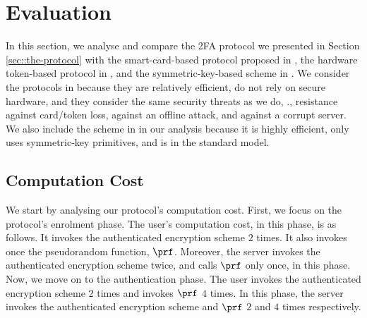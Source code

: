 

\section{Evaluation}\label{app:long-eval}

In this section, we analyse and compare the 2FA protocol we presented in Section \ref{sec::the-protocol} with the smart-card-based protocol proposed in  \cite{WangW18}, the hardware token-based protocol in \cite{JareckiJKSS21}, and the symmetric-key-based scheme in  \cite{MatsuoMY11}.  We consider the protocols in  \cite{WangW18,JareckiJKSS21} because they are relatively efficient, do not rely on secure hardware, and they consider the same security threats as we do, \ie., resistance against card/token loss, against an offline attack, and against a corrupt server. We also include the scheme in  \cite{MatsuoMY11}  in our analysis because it is highly efficient, only uses symmetric-key primitives, and is in the standard model. 
 









\subsection{Computation Cost}

We start by analysing our protocol's computation cost. First, we focus on the protocol's enrolment phase. The user's computation cost, in this phase, is as follows. It invokes the authenticated encryption scheme $2$ times. It also invokes once the pseudorandom function, $\prf$.
%
% 
  Moreover, the server invokes the authenticated encryption scheme twice, and calls $\prf$ only once, in this phase. 
%  
%
Now, we move on to the authentication phase. The user invokes the authenticated encryption scheme $2$ times and invokes $\prf$ $4$ times. 
%
%
 In this phase, the server invokes the authenticated encryption scheme and $\prf$ $2$ and $4$ times respectively. %

